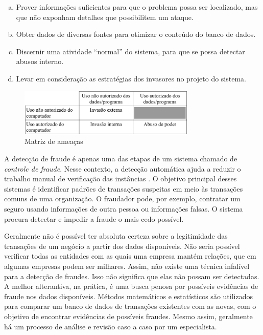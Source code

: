 \begin{enumerate}[a)]
\item Prover informações suficientes para que o problema possa ser localizado, mas que não exponham detalhes que possibilitem um ataque.
\item Obter dados de diversas fontes para otimizar o conteúdo do banco de dados.
\item Discernir uma atividade ``normal'' do sistema, para que se possa detectar abusos interno.
\item Levar em consideração as estratégias dos invasores no projeto do sistema.
\end{enumerate}

\begin{figure}[h!]
\centering
\includegraphics[width=0.75\textwidth]{img/anderson.png}
\caption{Matriz de ameaças}
\label{fig:and}
\end{figure}
A detecção de fraude é apenas uma das etapas de um sistema chamado de \emph{controle de fraude}. Nesse contexto, a detecção automática ajuda a reduzir o trabalho manual de verificação das instâncias \cite{Phua2010}. O objetivo principal desses sistemas é identificar padrões de transações suspeitas em meio às transações comuns de uma organização. O fraudador pode, por exemplo, contratar um seguro usando informações de outra pessoa ou informações falsas. O sistema procura detectar e impedir a fraude o mais cedo possível.


Geralmente não é possível ter absoluta certeza sobre a legitimidade das transações de um negócio a partir dos dados disponíveis. Não seria possível verificar todas as entidades com as quais uma empresa mantém relações, que em algumas empresas podem ser milhares. Assim, não existe uma técnica infalível para a detecção de fraudes. Isso não significa que elas não possam ser detectadas. A melhor alterantiva, na prática, é uma busca penosa por possíveis evidências de fraude nos dados disponíveis. Métodos matemáticos e estatísticos são utilizados para comparar um banco de dados de transações existentes com as novas, com o objetivo de encontrar evidências de possíveis fraudes. Mesmo assim, geralmente há um processo de análise e revisão caso a caso por um especialista.

